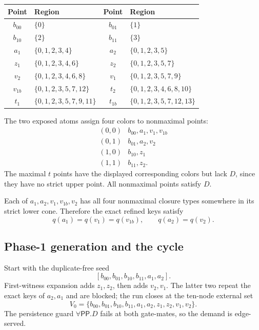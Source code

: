 \documentclass[11pt]{article}
\newcommand{\PP}{\mathsf{PP}}
\begin{document}
\begin{center}
\small
\renewcommand{\arraystretch}{1.13}
\begin{tabularx}{\linewidth}{>{\bfseries}c X >{\bfseries}c X}
\toprule
Point & Region & Point & Region \\
\midrule
$b_{00}$ & $\{0\}$ & $b_{01}$ & $\{1\}$ \\
$b_{10}$ & $\{2\}$ & $b_{11}$ & $\{3\}$ \\
$a_1$ & $\{0,1,2,3,4\}$ & $a_2$ & $\{0,1,2,3,5\}$ \\
$z_1$ & $\{0,1,2,3,4,6\}$ & $z_2$ & $\{0,1,2,3,5,7\}$ \\
$v_2$ & $\{0,1,2,3,4,6,8\}$ & $v_1$ & $\{0,1,2,3,5,7,9\}$ \\
$v_{1b}$ & $\{0,1,2,3,5,7,12\}$ & $t_2$ & $\{0,1,2,3,4,6,8,10\}$ \\
$t_1$ & $\{0,1,2,3,5,7,9,11\}$ & $t_{1b}$ & $\{0,1,2,3,5,7,12,13\}$ \\
\bottomrule
\end{tabularx}
\end{center}

The two exposed atoms assign four colors to nonmaximal points:
\[
\begin{array}{c|l}
(0,0) & b_{00},a_1,v_1,v_{1b}\\
(0,1) & b_{01},a_2,v_2\\
(1,0) & b_{10},z_1\\
(1,1) & b_{11},z_2.
\end{array}
\]
The maximal $t$ points have the displayed corresponding colors but lack $D$, since they
have no strict upper point. All nonmaximal points satisfy $D$.

Each of $a_1,a_2,v_1,v_{1b},v_2$ has all four nonmaximal closure types somewhere in its
strict lower cone. Therefore the exact refined keys satisfy
\[
  q(a_1)=q(v_1)=q(v_{1b}),\qquad q(a_2)=q(v_2).
\]

\subsection{Phase-1 generation and the cycle}

Start with the duplicate-free seed
\[
  [b_{00},b_{01},b_{10},b_{11},a_1,a_2].
\]
First-witness expansion adds $z_1,z_2$, then adds $v_2,v_1$. The latter two repeat the
exact keys of $a_2,a_1$ and are blocked; the run closes at the ten-node external set
\[
  V_0=\{b_{00},b_{01},b_{10},b_{11},a_1,a_2,z_1,z_2,v_1,v_2\}.
\]
The persistence guard $\forall\PP.D$ fails at both gate-mates, so the demand is
edge-served.
\end{document}
